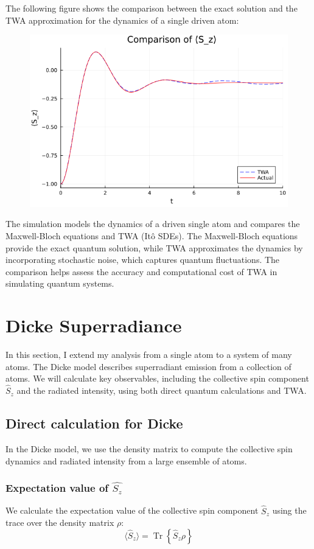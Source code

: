 \documentclass{article}
\begin{document}
    The following figure shows the comparison between the exact solution and the TWA approximation for the dynamics of a single driven atom:
    \begin{figure}[H]
        \centering
        \includegraphics[width=0.65\linewidth]{Sz.png}
    \end{figure}
    
    The simulation models the dynamics of a driven single atom and compares the Maxwell-Bloch equations and TWA (Itô SDEs). The Maxwell-Bloch equations provide the exact quantum solution, while TWA approximates the dynamics by incorporating stochastic noise, which captures quantum fluctuations. The comparison helps assess the accuracy and computational cost of TWA in simulating quantum systems.
    
    \section{Dicke Superradiance}
    In this section, I extend my analysis from a single atom to a system of many atoms. The Dicke model describes superradiant emission from a collection of atoms. We will calculate key observables, including the collective spin component $\hat{S}_z$ and the radiated intensity, using both direct quantum calculations and TWA.

    \subsection{Direct calculation for Dicke}
    In the Dicke model, we use the density matrix to compute the collective spin dynamics and radiated intensity from a large ensemble of atoms.

    \subsubsection{Expectation value of $\hat{S_z}$}
    We calculate the expectation value of the collective spin component $\hat{S}_z$ using the trace over the density matrix $\rho$:
    \begin{equation}
        \langle \hat{S}_z \rangle = \operatorname{Tr}\left\{\hat{S}_z \rho\right\}
    \end{equation}
    
\end{document}
